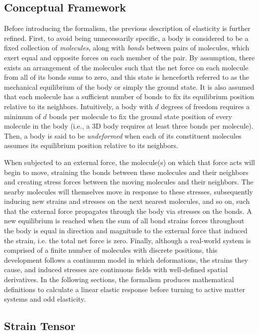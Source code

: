 \subsection{Conceptual Framework}
Before introducing the formalism, the previous description of elasticity is further refined.  First, to avoid being unnecessarily specific, a body is considered to be a fixed collection of \textit{molecules}, along with \textit{bonds} between pairs of molecules, which exert equal and opposite forces on each member of the pair.  By assumption, there exists an arrangement of the molecules such that the net force on each molecule from all of its bonds sums to zero, and this state is henceforth referred to as the mechanical equilibrium of the body or simply the ground state.  It is also assumed that each molecule has a sufficient number of bonds to fix its equilibrium position relative to its neighbors. Intuitively, a body with $d$ degrees of freedom requires a minimum of $d$ bonds per molecule to fix the ground state position of every molecule in the body (i.e., a 3D body requires at least three bonds per molecule).  Then, a body is said to be \textit{undeformed} when each of its constituent molecules assumes its equilibrium position relative to its neighbors.

When subjected to an external force, the molecule(s) on which that force acts will begin to move, straining the bonds between these molecules and their neighbors and creating stress forces between the moving molecules and their neighbors.  The nearby molecules will themselves move in response to these stresses, subsequently inducing new strains and stresses on the next nearest molecules, and so on, such that the external force propagates through the body via stresses on the bonds.  A new equilibrium is reached when the sum of all bond strains forces throughout the body is equal in direction and magnitude to the external force that induced the strain, i.e. the total net force is zero.  Finally, although a real-world system is comprised of a finite number of molecules with discrete positions, this development follows a continuum model in which deformations, the strains they cause, and induced stresses are continuous fields with well-defined spatial derivatives.  In the following sections, the formalism produces mathematical definitions to calculate a linear elastic response before turning to active matter systems and odd elasticity.

\subsection{Strain Tensor}\label{sec:el-landau-strain-tensor}

